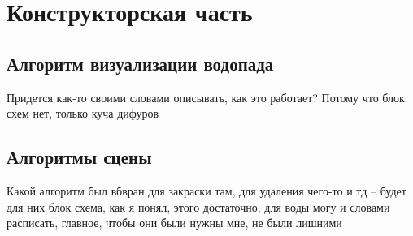 \chapter{Конструкторская часть}

\section{Алгоритм визуализации водопада}
Придется как-то своими словами описывать, как это работает? Потому что блок схем нет, только куча дифуров
\section{Алгоритмы сцены}
Какой алгоритм был вбвран для закраски там, для удаления чего-то и тд -- будет для них блок схема, как я понял, этого достаточно, для воды могу и словами расписать, главное, чтобы они были нужны мне, не были лишними
